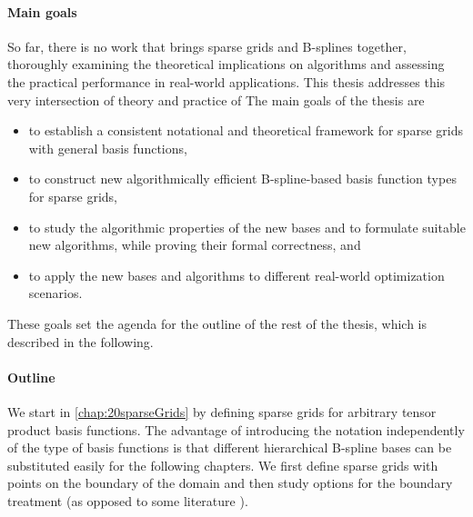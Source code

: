 \paragraph{Main goals}

So far, there is no work that brings sparse grids and B-splines together,
thoroughly examining the theoretical implications on algorithms and
assessing the practical performance in real-world applications.
This thesis addresses this very intersection of theory and practice of
The main goals of the thesis are
\begin{itemize}
  \item
  to establish a consistent notational and theoretical
  framework for sparse grids with general basis functions,
  
  \item
  to construct new algorithmically efficient
  B-spline-based basis function types for sparse grids,
  
  \item
  to study the algorithmic properties of the new bases and
  to formulate suitable new algorithms,
  while proving their formal correctness, and
  
  \item
  to apply the new bases and algorithms to different real-world
  optimization scenarios.
\end{itemize}
These goals set the agenda for the outline of the rest of the thesis,
which is described in the following.

\paragraph{Outline}

We start in \cref{chap:20sparseGrids} by defining sparse grids
for arbitrary tensor product basis functions.
The advantage of introducing the notation independently
of the type of basis functions is that
different hierarchical B-spline bases can be substituted easily
for the following chapters.
We first define sparse grids with points on the boundary of the domain
and then study options for the boundary treatment
(as opposed to some literature %
).

